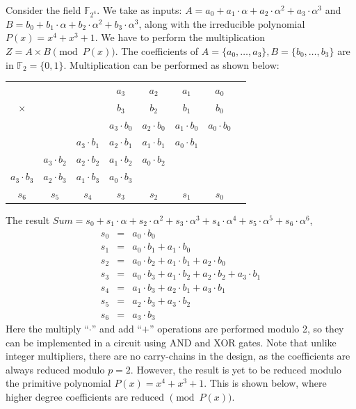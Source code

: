 \begin{Example}
\label{exp:mul}
Consider the field $\mathbb{F}_{2^4}$. We take as inputs:
$A=a_0+a_1\cdot \alpha+a_2\cdot \alpha^2+a_3\cdot \alpha^3$ and
$B=b_0+b_1\cdot \alpha+b_2\cdot \alpha^2+b_3\cdot \alpha^3$, along
with the irreducible polynomial $P(x)=x^4+x^3+1$. We have to perform the
multiplication $Z =A\times B \pmod{ P(x) }$. The coefficients
of $A = \{a_0, \dots, a_3\}, B = \{b_0, \dots, b_3\}$ are in
$\mathbb{F}_2 = \{0, 1\}$. Multiplication can be performed as
shown below:   


{\begin{tabular}{c c c c c c c c}
  &   &   & $a_3$ & $a_2$ & $a_1$ & $a_0$  \\ 
 $\times$&   &   & $b_3$ & $b_2$ & $b_1$ & $b_0$  \\ 
 \hline
 &   &   & $a_3\cdot b_0$ & $a_2 \cdot b_0$ & $a_1\cdot b_0$ & $a_0\cdot b_0$ \\
 &  & $a_3\cdot b_1$ & $a_2\cdot b_1$ & $a_1 \cdot b_1$ & $a_0\cdot b_1$ &   \\
 & $a_3\cdot b_2$ & $a_2\cdot b_2$ & $a_1\cdot b_2$ & $a_0\cdot b_2$ &  &   \\
 $a_3\cdot b_3$ & $a_2\cdot b_3$ & $a_1\cdot b_3$ & $a_0\cdot b_3$ &  &  &   \\
 \hline
 $s_6$& $s_5$  & $s_4$  & $s_3$ & $s_2$  & $s_1$   & $s_0$ 
\end{tabular}}


The result $Sum = s_0+s_1\cdot \alpha + s_2\cdot \alpha^2 + s_3\cdot
\alpha^3 + s_4\cdot \alpha^4 + s_5\cdot \alpha^5 + s_6\cdot \alpha^6$,
\begin{eqnarray}
	s_0  &=&  a_0\cdot b_0 \nonumber \\ 
	s_1  &=&  a_0\cdot b_1 + a_1\cdot b_0 \nonumber \\
	s_2  &=&  a_0\cdot b_2 + a_1\cdot b_1 + a_2\cdot b_0 \nonumber \\
	s_3  &=&  a_0\cdot b_3 + a_1\cdot b_2 + a_2\cdot b_2 +  a_3\cdot b_1\nonumber \\
	s_4  &=&  a_1\cdot  b_3 + a_2\cdot b_1 + a_3\cdot b_1 \nonumber \\
	s_5  &=&  a_2\cdot b_3 + a_3\cdot b_2  \nonumber \\
	s_6  &=&  a_3\cdot b_3   \nonumber
\end{eqnarray}
 Here the multiply ``$\cdot$'' and add ``$+$'' operations are performed
modulo 2, so they can be implemented in a circuit using AND and XOR
gates. Note that unlike integer multipliers, there are no carry-chains
in the design, as the coefficients are always reduced modulo $p =
2$. However, the result is yet to be reduced modulo the primitive
polynomial $P(x) = x^4 + x^3 + 1$. This is shown below, where higher 
degree coefficients are reduced $\pmod{P(x)}$.



\end{Example}
